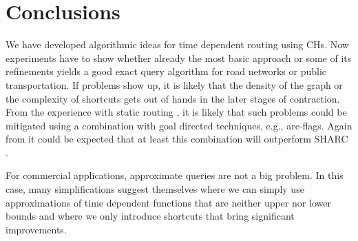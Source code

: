 \documentclass[12pt]{article}
\begin{document}
\section{Conclusions}\label{s:conclusions}

We have developed algorithmic ideas for time dependent routing using CHs.
Now experiments have to show whether already the most basic approach
or some of its refinements yields a good exact query algorithm for road networks
or public transportation.
If problems show up, it is likely that the density of the graph or
the complexity of shortcuts gets out of hands in the later stages
of contraction. From the experience with static routing
\cite{BDSSSW08}, it is likely that such problems could be mitigated using
a combination with goal directed techniques, e.g., arc-flags. 
Again from \cite{BDSSSW08} it could be expected that at least this 
combination will outperform SHARC \cite{Del08}.

For commercial applications, approximate queries are not a big problem.
In this case, many simplifications suggest themselves where we 
can simply use approximations of time dependent functions
that are neither upper nor lower bounds and where we only introduce
shortcuts that bring significant improvements. 





\end{document}
